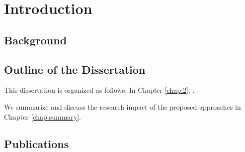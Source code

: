 \chapter{Introduction}

\section{Background}
\Blindtext

\section{Outline of the Dissertation}
This dissertation is organized as follows: In Chapter \ref{chap:2}, \blindtext.

We summarize and discuss the research impact of the proposed approaches in Chapter \ref{chap:summary}.

\section{Publications}





